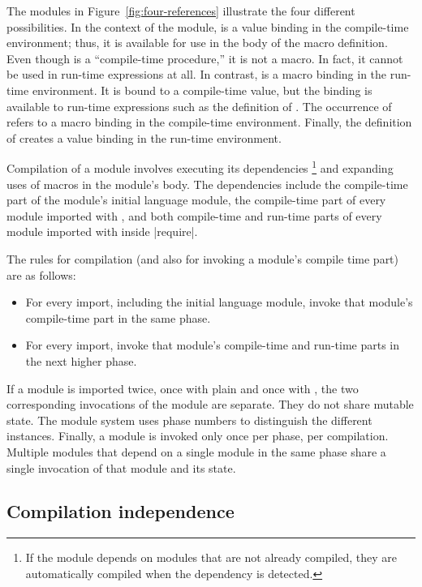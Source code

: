\begin{schemeregion}
The modules in Figure~\ref{fig:four-references} illustrate the four
different possibilities.
%
In the context of the  module,
 is a value binding in the
compile-time environment; thus, it is available for use in the body of
the  macro definition. Even though
 is a ``compile-time procedure,''
it is not a macro. In fact, it cannot be used in run-time expressions
at all.
%
In contrast,  is a macro binding in the run-time
environment. It is bound to a compile-time value, but the
binding is available to run-time expressions such as the definition of
.
%
The occurrence of  refers to a macro binding in
the compile-time environment. Finally, the definition of
 creates a value binding in the run-time
environment.

Compilation of a module involves executing its dependencies%
\footnote{If the module depends on modules that are not already
  compiled, they are automatically compiled when the dependency is
  detected.} and expanding uses of macros in the module's body. The
dependencies include the compile-time part of the module's initial
language module, the compile-time part of every module imported with
, and both compile-time and run-time parts of every
module imported with  inside \scheme|require|. 

The rules for compilation (and also for invoking a module's compile
time part) are as follows:
\begin{itemize}
\item
For every  import, including the initial language
module, invoke that module's compile-time part in the same phase.
\item
For every  import, invoke that module's
compile-time and run-time parts in the next higher phase.
\end{itemize}
If a module is imported twice, once with plain  and once with
, the two corresponding invocations of the
module are separate. They do not share mutable state. The module
system uses phase numbers to distinguish the different instances.
%
Finally, a module is invoked only once per phase, per
compilation. Multiple modules that depend on a single module in the
same phase share a single invocation of that module and its state.

\subsection{Compilation independence}


\end{schemeregion}
